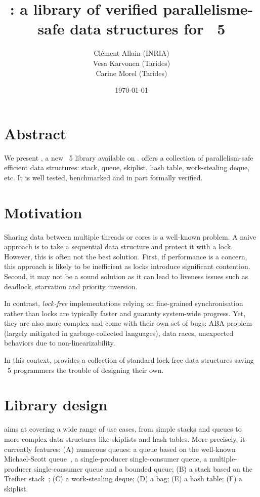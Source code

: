 \documentclass[a4paper, 11pt]{article}
\title{\Saturn: a library of verified parallelisme-safe data structures for \OCaml~5}
\date{\today}
\author{
  Clément Allain (INRIA) \\
  Vesa Karvonen (Tarides) \\
  Carine Morel (Tarides)
}
\begin{document}
\maketitle

\section{Abstract}

We present \Saturn, a new \OCaml~5 library available on \opam.
\Saturn offers a collection of parallelism-safe efficient data structures: stack, queue, skiplist, hash table, work-stealing deque, etc.
It is well tested, benchmarked and in part formally verified.

\section{Motivation}

Sharing data between multiple threads or cores is a well-known problem.
A naive approach is to take a sequential data structure and protect it with a lock.
However, this is often not the best solution.
First, if performance is a concern, this approach is likely to be inefficient as locks introduce significant contention.
Second, it may not be a sound solution as it can lead to liveness issues such as deadlock, starvation and priority inversion.

In contrast, \emph{lock-free} implementations relying on fine-grained synchronisation rather than locks are typically faster and guaranty system-wide progress.
Yet, they are also more complex and come with their own set of bugs: ABA problem (largely mitigated in garbage-collected languages), data races, unexpected behaviors due to non-linearizability.

In this context, \Saturn provides a collection of standard lock-free data structures saving \OCaml~5 programmers the trouble of designing their own.

\section{Library design}

\Saturn aims at covering a wide range of use cases, from simple stacks and queues to more complex data structures like skiplists and hash tables.
More precisely, it currently features:
(A) numerous queues: a queue based on the well-known Michael-Scott queue~\cite{michael1996simple}, a single-producer single-consumer queue, a multiple-producer single-consumer queue and a bounded queue; 
(B) a stack based on the Treiber stack~\cite{treiber1986systems};
(C) a work-stealing deque;
(D) a bag;
(E) a hash table;
(F) a skiplist.
\end{document}
